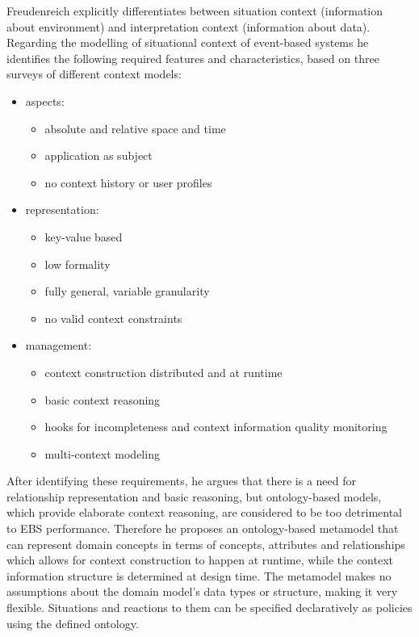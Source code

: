 Freudenreich explicitly differentiates between situation context (information about environment) and interpretation context (information about data). Regarding the modelling of situational context of event-based systems he identifies the following required features and characteristics, based on three surveys of different context models: 
\begin{itemize}
\item aspects:
\begin{itemize}
\item absolute and relative space and time 
\item application as subject
\item no context history or user profiles
\end{itemize}
\item representation: 
\begin{itemize}
\item key-value based
\item low formality
\item fully general, variable granularity
\item no valid context constraints
\end{itemize}
\item management: 
\begin{itemize}
\item context construction distributed and at runtime
\item basic context reasoning
\item hooks for incompleteness and context information quality monitoring
\item multi-context modeling
\end{itemize}
\end{itemize}
After identifying these requirements, he argues that there is a need for relationship representation and basic reasoning, but ontology-based models, which provide elaborate context reasoning, are considered to be too detrimental to EBS performance. Therefore he proposes an ontology-based metamodel that can represent domain concepts in terms of concepts, attributes and relationships which allows for context construction to happen at runtime, while the context information structure is determined at design time. The metamodel makes no assumptions about the domain model's data types or structure, making it very flexible. Situations and reactions to them can be specified declaratively as policies using the defined ontology.

